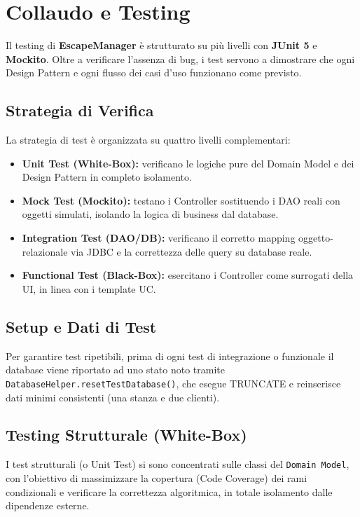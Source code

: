 \chapter{Collaudo e Testing}

Il testing di \textbf{EscapeManager} è strutturato su più livelli con \textbf{JUnit 5} e \textbf{Mockito}. Oltre a verificare l'assenza di bug, i test servono a dimostrare che ogni Design Pattern e ogni flusso dei casi d'uso funzionano come previsto.

\section{Strategia di Verifica}
La strategia di test è organizzata su quattro livelli complementari:
\begin{itemize}
    \item \textbf{Unit Test (White-Box):} verificano le logiche pure del Domain Model e dei Design Pattern in completo isolamento.
    \item \textbf{Mock Test (Mockito):} testano i Controller sostituendo i DAO reali con oggetti simulati, isolando la logica di business dal database.
    \item \textbf{Integration Test (DAO/DB):} verificano il corretto mapping oggetto-relazionale via JDBC e la correttezza delle query su database reale.
    \item \textbf{Functional Test (Black-Box):} esercitano i Controller come surrogati della UI, in linea con i template UC.
\end{itemize}

\section{Setup e Dati di Test}
Per garantire test ripetibili, prima di ogni test di integrazione o funzionale il database viene riportato ad uno stato noto tramite \texttt{DatabaseHelper.resetTestDatabase()}, che esegue TRUNCATE e reinserisce dati minimi consistenti (una stanza e due clienti).

\section{Testing Strutturale (White-Box)}

I test strutturali (o Unit Test) si sono concentrati sulle classi del \texttt{Domain Model}, con l'obiettivo di massimizzare la copertura (Code Coverage) dei rami condizionali e verificare la correttezza algoritmica, in totale isolamento dalle dipendenze esterne.

